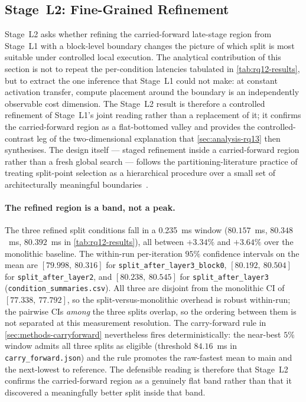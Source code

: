 \subsection{Stage~L2: Fine-Grained Refinement}
\label{sec:analysis-rq12}

Stage~L2 asks whether refining the carried-forward late-stage region from Stage~L1
with a block-level boundary changes the picture of which split is most
suitable under controlled local execution. The analytical contribution of
this section is not to repeat the per-condition latencies tabulated in
\cref{tab:rq12-results}, but to extract the one inference that Stage~L1 could
not make: at constant activation transfer, compute placement around the
boundary is an independently observable cost dimension. The Stage~L2 result is
therefore a controlled refinement of Stage~L1's joint reading rather than a
replacement of it; it confirms the carried-forward region as a flat-bottomed
valley and provides the controlled-contrast leg of the two-dimensional
explanation that \cref{sec:analysis-rq13} then synthesises. The design
itself --- staged refinement inside a carried-forward region rather than a
fresh global search --- follows the partitioning-literature practice of
treating split-point selection as a hierarchical procedure over a small set
of architecturally meaningful boundaries~\cite{dnnsplit,%
fine_grained_partitioning,hierarchical_partitioning}.

\paragraph{The refined region is a band, not a peak.}
The three refined split conditions fall in a 0.235~ms window
(\(80.157\)~ms, \(80.348\)~ms, \(80.392\)~ms in \cref{tab:rq12-results}),
all between \(+3.34\%\) and \(+3.64\%\) over the monolithic baseline. The
within-run per-iteration \(95\%\) confidence intervals on the mean are
\([79.998,\ 80.316]\) for \texttt{split\_after\_layer3\_block0},
\([80.192,\ 80.504]\) for \texttt{split\_after\_layer2}, and
\([80.238,\ 80.545]\) for \texttt{split\_after\_layer3}
(\texttt{condition\_summaries.csv}). All three are disjoint from the
monolithic CI of \([77.338,\ 77.792]\), so the split-versus-monolithic
overhead is robust within-run; the pairwise CIs \emph{among} the three
splits overlap, so the ordering between them is not separated at this
measurement resolution. The carry-forward rule in
\cref{sec:methods-carryforward} nevertheless fires deterministically: the
near-best \(5\%\) window admits all three splits as eligible (threshold
\(84.16\)~ms in \texttt{carry\_forward.json}) and the rule promotes the
raw-fastest mean to main and the next-lowest to reference. The defensible
reading is therefore that Stage~L2 confirms the carried-forward region as a
genuinely flat band rather than that it discovered a meaningfully better
split inside that band.

